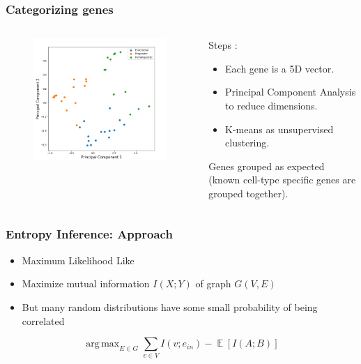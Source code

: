 \documentclass[14pt,aspectratio=169]{beamer}
\DeclareMathOperator*{\argmax}{arg\,max}
\DeclareMathOperator{\EX}{\mathbb{E}}
\begin{document}
 \begin{frame}
 	\frametitle{Categorizing genes}
 	\begin{columns}[T] %
 		\begin{column}{.48\textwidth}
 			\begin{figure}
 				\includegraphics*[width=  \linewidth]{../Preliminary/genepca.png}
 			\end{figure}
 		\end{column}%
 		\hfill%
 		\begin{column}{.6\textwidth}
 			Steps :\\
 			\begin{itemize}
 				\item Each gene is a 5D vector.
 				\item Principal Component Analysis to reduce dimensions.
 				\item K-means as unsupervised clustering.
 			\end{itemize}
 			Genes grouped as expected (known cell-type specific genes are grouped together).
 		\end{column}%
 	\end{columns}
 \end{frame}
 

\begin{frame}
\frametitle{Entropy Inference: Approach}
\small
\begin{itemize}
\item Maximum Likelihood Like
\item Maximize mutual information $I(X;Y)$ of graph $G(V,E)$
\item But many random distributions have some small probability of being correlated
\end{itemize}

\begin{equation} \label{eq:1}
\argmax_{E \in G} \sum_{v \in V} I(v;e_{in}) - \EX[I(A;B)]
\end{equation}

\end{frame}
\end{document}
